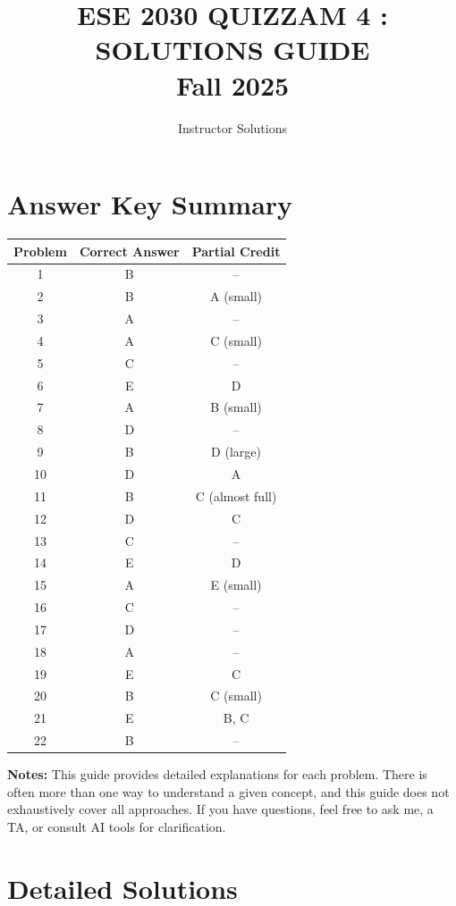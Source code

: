 \documentclass[12pt]{amsart}
\title{ESE 2030 QUIZZAM 4 : SOLUTIONS GUIDE\\Fall 2025}
\author{Instructor Solutions}
\begin{document}
\maketitle

\section*{Answer Key Summary}
\begin{center}
\begin{tabular}{|c|c|c|}
\hline
Problem & Correct Answer & Partial Credit \\
\hline
1 & B & -- \\
2 & B & A (small) \\
3 & A & -- \\
4 & A & C (small) \\
5 & C & -- \\
6 & E & D \\
7 & A & B (small) \\
8 & D & -- \\
9 & B & D (large) \\
10 & D & A \\
11 & B & C (almost full) \\
12 & D & C \\
13 & C & -- \\
14 & E & D \\
15 & A & E (small) \\
16 & C & -- \\
17 & D & -- \\
18 & A & -- \\
19 & E & C \\
20 & B & C (small) \\
21 & E & B, C \\
22 & B & -- \\
\hline
\end{tabular}
\end{center}

\textbf{Notes:} This guide provides detailed explanations for each problem. There is often more than one way to understand a given concept, and this guide does not exhaustively cover all approaches. If you have questions, feel free to ask me, a TA, or consult AI tools for clarification.

\newpage

\section*{Detailed Solutions}
\end{document}
